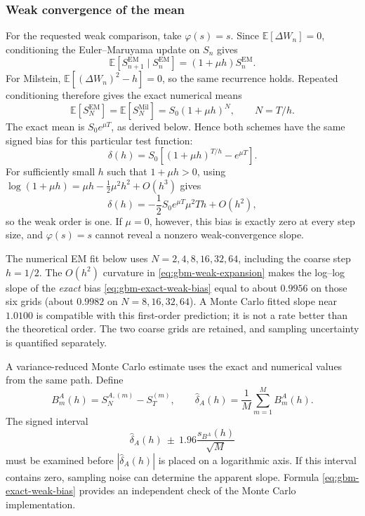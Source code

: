 \subsubsection{Weak convergence of the mean}

For the requested weak comparison, take $\varphi(s)=s$.  Since
$\mathbb{E}[\Delta W_n]=0$, conditioning the Euler--Maruyama update on $S_n$
gives
\[
    \mathbb{E}[S_{n+1}^{\mathrm{EM}}\mid S_n^{\mathrm{EM}}]
      =(1+\mu h)S_n^{\mathrm{EM}}.
\]
For Milstein, $\mathbb{E}[(\Delta W_n)^2-h]=0$, so the same recurrence holds.
Repeated conditioning therefore gives the exact numerical means
\begin{equation}
    \mathbb{E}[S_N^{\mathrm{EM}}]
      =\mathbb{E}[S_N^{\mathrm{Mil}}]
      =S_0(1+\mu h)^N,
    \qquad N=T/h.
    \label{eq:gbm-numerical-mean}
\end{equation}
The exact mean is $S_0e^{\mu T}$, as derived below.  Hence both schemes have
the same signed bias for this particular test function:
\begin{equation}
    \delta(h)=S_0\left[(1+\mu h)^{T/h}-e^{\mu T}\right].
    \label{eq:gbm-exact-weak-bias}
\end{equation}
For sufficiently small $h$ such that $1+\mu h>0$, using
$\log(1+\mu h)=\mu h-\tfrac12\mu^2h^2+O(h^3)$ gives
\begin{equation}
    \delta(h)
      =-\frac12S_0e^{\mu T}\mu^2T h+O(h^2),
    \label{eq:gbm-weak-expansion}
\end{equation}
so the weak order is one.  If $\mu=0$, however, this bias is exactly zero at
every step size, and $\varphi(s)=s$ cannot reveal a nonzero weak-convergence
slope.

The numerical EM fit below uses $N=2,4,8,16,32,64$, including the coarse
step $h=1/2$.  The $O(h^2)$ curvature in
\eqref{eq:gbm-weak-expansion} makes the log--log slope of the \emph{exact}
bias \eqref{eq:gbm-exact-weak-bias} equal to about $0.9956$ on those six
grids (about $0.9982$ on $N=8,16,32,64$).  A Monte Carlo fitted slope near
$1.0100$ is compatible with this first-order prediction; it is not a rate
better than the theoretical order.  The two coarse grids are retained, and
sampling uncertainty is quantified separately.

A variance-reduced Monte Carlo estimate uses the exact and numerical values
from the same path.  Define
\[
    B_m^A(h)=S_N^{A,(m)}-S_T^{(m)},
    \qquad
    \widehat\delta_A(h)=\frac1M\sum_{m=1}^{M}B_m^A(h).
\]
The signed interval
\begin{equation}
    \widehat\delta_A(h)
       \ \pm\ 1.96\frac{s_{B^A}(h)}{\sqrt M}
    \label{eq:gbm-weak-ci}
\end{equation}
must be examined before $|\widehat\delta_A(h)|$ is placed on a logarithmic
axis.  If this interval contains zero, sampling noise can determine the apparent
slope.  Formula \eqref{eq:gbm-exact-weak-bias} provides an independent check of
the Monte Carlo implementation.

